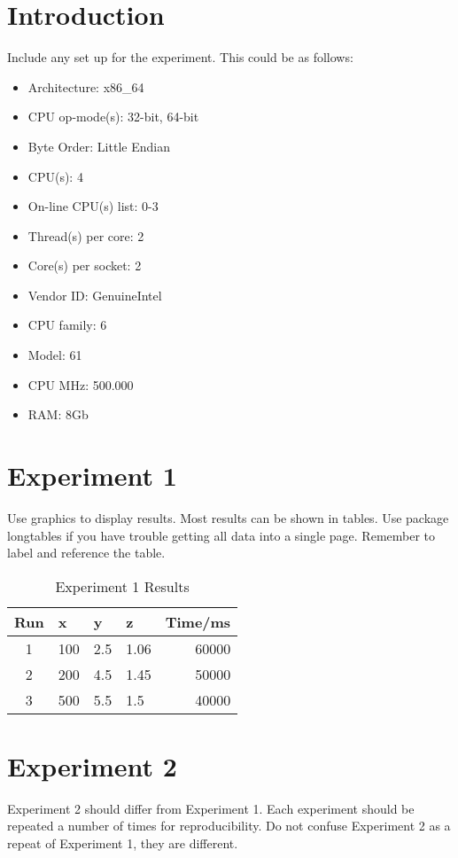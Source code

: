 \section{Introduction}
Include any set up for the experiment. This could be as follows:
\begin{itemize}
\item Architecture:          x86\_64
\item CPU op-mode(s):        32-bit, 64-bit
\item Byte Order:            Little Endian
\item CPU(s):                4
\item On-line CPU(s) list:   0-3
\item Thread(s) per core:    2
\item Core(s) per socket:    2
\item Vendor ID:             GenuineIntel
\item CPU family:            6
\item Model:                 61
\item CPU MHz:               500.000
\item RAM:					 8Gb
\end{itemize}
\section{Experiment 1}
Use graphics to display results. Most results can be shown in tables. Use package longtables if you have trouble getting all data into a single page. Remember to label and reference the table.

\begin{table}
	\centering
	\begin{tabular}{|c|l|l|l||r|}\hline
	Run	&	x	&	y 	&	z	& Time/ms\\ \hline
	1	&	100	&	2.5	& 	1.06	& 60000 \\ \hline
	2	&	200	&	4.5	&	1.45	& 50000 \\ \hline
	3	&	500	&	5.5	&	1.5	& 40000 \\ \hline
	\end{tabular}
	\caption{Experiment 1 Results}
	\label{ta:ex1}
\end{table}


\section{Experiment 2}
Experiment 2 should differ from Experiment 1. Each experiment should be repeated a number of times for reproducibility. Do not confuse Experiment 2 as a repeat of Experiment 1, they are different. 

